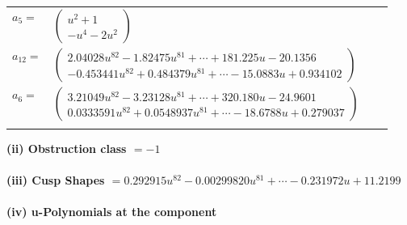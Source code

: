 \documentclass[1p]{elsarticle_modified}
\theoremstyle{definition}
\begin{document}
\begin{tabular}{m{7pt} m{180pt} m{7pt} m{180pt} }
\flushright $a_{5}=$&$\begin{pmatrix}u^2+1\\- u^4-2 u^2\end{pmatrix}$ \\
\flushright $a_{12}=$&$\begin{pmatrix}2.04028 u^{82}-1.82475 u^{81}+\cdots+181.225 u-20.1356\\-0.453441 u^{82}+0.484379 u^{81}+\cdots-15.0883 u+0.934102\end{pmatrix}$ \\
\flushright $a_{6}=$&$\begin{pmatrix}3.21049 u^{82}-3.23128 u^{81}+\cdots+320.180 u-24.9601\\0.0333591 u^{82}+0.0548937 u^{81}+\cdots-18.6788 u+0.279037\end{pmatrix}$\\&\end{tabular}
\flushleft \textbf{(ii) Obstruction class $= -1$}\\~\\
\flushleft \textbf{(iii) Cusp Shapes $= 0.292915 u^{82}-0.00299820 u^{81}+\cdots-0.231972 u+11.2199$}\\~\\
\newpage\renewcommand{\arraystretch}{1}
\flushleft \textbf{(iv) u-Polynomials at the component}\newline \\
\end{document}
